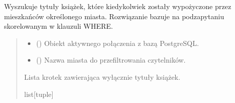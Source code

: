 \documentclass[letterpaper,10pt,english]{sphinxmanual}
\begin{document}

\begin{fulllineitems}
\label{\detokenize{rozdzial_5/index:biblioteka_zapytania.get_ksiazki_wypozyczone_w_miescie}}
\pysigstartsignatures
\pysiglinewithargsret
{}
{\sphinxparamcomma {}}
{}
\pysigstopsignatures
\sphinxAtStartPar
Wyszukuje tytuły książek, które kiedykolwiek zostały wypożyczone przez mieszkańców określonego miasta.
Rozwiązanie bazuje na podzapytaniu skorelowanym w klauzuli WHERE.
\begin{quote}\begin{description}
\begin{itemize}
\item {} 
\sphinxAtStartPar
{} () \textendash{} Obiekt aktywnego połączenia z bazą PostgreSQL.

\item {} 
\sphinxAtStartPar
{} () \textendash{} Nazwa miasta do przefiltrowania czytelników.

\end{itemize}

\sphinxAtStartPar
Lista krotek zawierająca wyłącznie tytuły książek.

\sphinxAtStartPar
list{[}tuple{]}

\end{description}\end{quote}

\end{fulllineitems}

\end{document}

